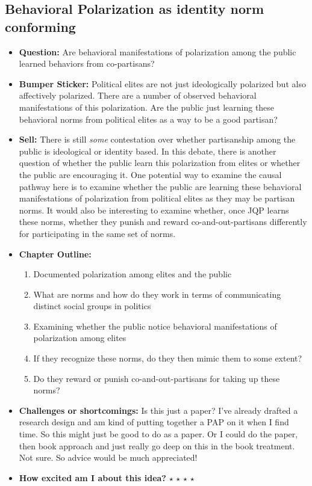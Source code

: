 \documentclass[12pt]{article}
\begin{document}
\subsection{Behavioral Polarization as identity norm conforming}
    \begin{itemize}
        \item \textbf{Question:} Are behavioral manifestations of polarization among the public learned behaviors from co-partisans?
        \item \textbf{Bumper Sticker:} Political elites are not just ideologically polarized but also affectively polarized. There are a number of observed behavioral manifestations of this polarization. Are the public just learning these behavioral norms from political elites as a way to be a good partisan?
        \item \textbf{Sell:} There is still \textit{some} contestation over whether partisanship among the public is ideological or identity based. In this debate, there is another question of whether the public learn this polarization from elites or whether the public are encouraging it. One potential way to examine the causal pathway here is to examine whether the public are learning these behavioral manifestations of polarization from political elites as they may be partisan norms. It would also be interesting to examine whether, once JQP learns these norms, whether they punish and reward co-and-out-partisans differently for participating in the same set of norms.
        \item \textbf{Chapter Outline:}
        \begin{enumerate}
            \item Documented polarization among elites and the public
            \item What are norms and how do they work in terms of communicating distinct social groups in politics
            \item Examining whether the public notice behavioral manifestations of polarization among elites
            \item If they recognize these norms, do they then mimic them to some extent?
            \item Do they reward or punish co-and-out-partisans for taking up these norms?
        \end{enumerate}
        \item \textbf{Challenges or shortcomings:} Is this just a paper? I've already drafted a research design and am kind of putting together a PAP on it when I find time. So this might just be good to do as a paper. Or I could do the paper, then book approach and just really go deep on this in the book treatment. Not sure. So advice would be much appreciated!
        \item \textbf{How excited am I about this idea?} $\star$ $\star$ $\star$ $\star$
    \end{itemize}
\end{document}
